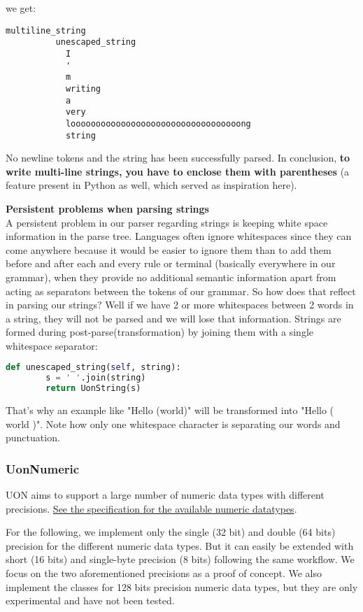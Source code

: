 \documentclass[12pt]{article}
\begin{document}
we get:
\begin{lstlisting}
multiline_string
          unescaped_string
            I
            '
            m
            writing
            a
            very
            loooooooooooooooooooooooooooooooooong
            string
\end{lstlisting}

No newline tokens and the string has been successfully parsed. In conclusion, \textbf{to write multi-line strings, you have to enclose them with parentheses} (a feature present in Python as well, which served as inspiration here).

\textbf{Persistent problems when parsing strings} \\

A persistent problem in our parser regarding strings is keeping white space information in the parse tree. Languages often ignore whitespaces since they can come anywhere because it would be easier to ignore them than to add them before and after each and every rule or terminal (basically everywhere in our grammar), when they provide no additional semantic information apart from acting as separators between the tokens of our grammar. So how does that reflect in parsing our strings? Well if we have 2 or more whitespaces between 2 words in a string, they will not be parsed and we will lose that information. Strings are formed during post-parse(transformation) by joining them with a single whitespace separator:

\begin{lstlisting}[language=Python]
def unescaped_string(self, string):
        s = ' '.join(string)
        return UonString(s)
\end{lstlisting}

That's why an example like "Hello \hspace{1cm} (world)" will be transformed into "Hello ( world )". Note how only one whitespace character is separating our words and punctuation.

\subsubsection{UonNumeric}
UON aims to support a large number of numeric data types with different precisions. \href{https://github.com/uon-language/specification/blob/master/spec.md#numbers-datatypes}{See the specification for the available numeric datatypes}.

For the following, we implement only the single (32 bit) and double (64 bits) precision for the different numeric data types. But it can easily be extended with short (16 bits) and single-byte precision (8 bits) following the same workflow. We focus on the two aforementioned precisions as a proof of concept. We also implement the classes for 128 bits precision numeric data types, but they are only experimental and have not been tested.
\end{document}
